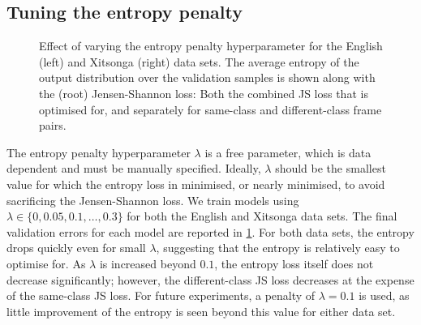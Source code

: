 \subsection{Tuning the entropy penalty}
\begin{figure}
  \centering

\caption{\label{fig:entropy-penalty} Effect of varying the entropy penalty hyperparameter for the English (left) and Xitsonga (right) data sets.
The average entropy of the output distribution over the validation samples is shown along with the (root) Jensen-Shannon loss: Both the combined JS loss that is optimised for, and separately for same-class and different-class frame pairs.}
\end{figure}

The entropy penalty hyperparameter $\lambda$ is a free parameter, which is data dependent and must be manually specified.
Ideally, $\lambda$ should be the smallest value for which the entropy loss in minimised, or nearly minimised, to avoid sacrificing the Jensen-Shannon loss.
We train models using $\lambda \in \{0, 0.05, 0.1, \dots, 0.3\}$ for both the English and Xitsonga data sets.
The final validation errors for each model are reported in \cref{fig:entropy-penalty}.
For both data sets, the entropy drops quickly even for small $\lambda$, suggesting that the entropy is relatively easy to optimise for.
As $\lambda$ is increased beyond $0.1$, the entropy loss itself does not decrease significantly; however, the different-class JS loss decreases at the expense of the same-class JS loss. 
For future experiments, a penalty of $\lambda = 0.1$ is used, as little improvement of the entropy is seen beyond this value for either data set.

